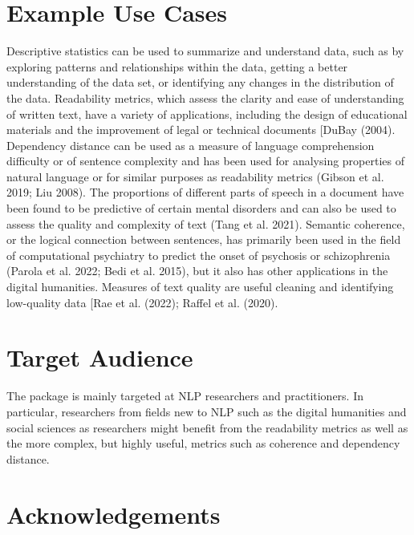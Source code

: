 \documentclass[
]{article}
\begin{document}
\hypertarget{example-use-cases}{%
\section{Example Use Cases}\label{example-use-cases}}

Descriptive statistics can be used to summarize and understand data,
such as by exploring patterns and relationships within the data, getting
a better understanding of the data set, or identifying any changes in
the distribution of the data. Readability metrics, which assess the
clarity and ease of understanding of written text, have a variety of
applications, including the design of educational materials and the
improvement of legal or technical documents {[}DuBay (2004). Dependency
distance can be used as a measure of language comprehension difficulty
or of sentence complexity and has been used for analysing properties of
natural language or for similar purposes as readability metrics (Gibson
et al. 2019; Liu 2008). The proportions of different parts of speech in
a document have been found to be predictive of certain mental disorders
and can also be used to assess the quality and complexity of text (Tang
et al. 2021). Semantic coherence, or the logical connection between
sentences, has primarily been used in the field of computational
psychiatry to predict the onset of psychosis or schizophrenia (Parola et
al. 2022; Bedi et al. 2015), but it also has other applications in the
digital humanities. Measures of text quality are useful cleaning and
identifying low-quality data {[}Rae et al. (2022); Raffel et al. (2020).

\hypertarget{target-audience}{%
\section{Target Audience}\label{target-audience}}

The package is mainly targeted at NLP researchers and practitioners. In
particular, researchers from fields new to NLP such as the digital
humanities and social sciences as researchers might benefit from the
readability metrics as well as the more complex, but highly useful,
metrics such as coherence and dependency distance.

\hypertarget{acknowledgements}{%
\section{Acknowledgements}\label{acknowledgements}}
\end{document}
